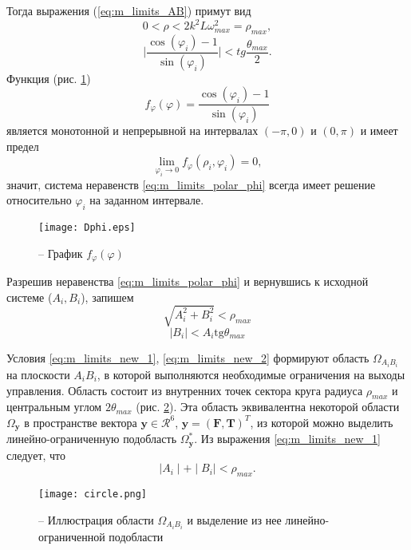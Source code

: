 Тогда выражения (\ref{eq:m_limits_AB}) примут вид
\begin{equation} \label{eq:m_limits_polar_rho}
0 < \rho < 
2 k^2 L\omega_{max}^2
= \rho_{max},
\end{equation}
\begin{equation} \label{eq:m_limits_polar_phi}
\Bigg| \frac{\cos(\varphi_i)-1}{\sin(\varphi_i)} \Bigg| < 
tg\frac{\theta_{max}}{2}.
\end{equation}
Функция (рис. \ref{fig:f_phi})
$$f_{\varphi}(\varphi) = \frac{\cos(\varphi_i)-1}{\sin(\varphi_i)}$$
является монотонной и непрерывной на интервалах 
$(-{\pi}, 0)$
и
$( 0, \pi)$
и имеет предел
$$\lim_{\varphi_i \to 0}
f_{\varphi}(\rho_i, \varphi_i) = 0,$$
значит, система неравенств
\eqref{eq:m_limits_polar_phi}
всегда имеет решение относительно $\varphi_i$ на заданном интервале.
\begin{figure}[h!]
	\centering
	\texttt{[image: Dphi.eps]}
	\caption{ -- График $f_{\varphi}(\varphi)$}
	\label{fig:f_phi}
\end{figure}
Разрешив неравенства \eqref{eq:m_limits_polar_phi} и вернувшись к исходной системе ($A_i, B_i$), запишем
\begin{equation} \label{eq:m_limits_new_1}
\sqrt{A^2_i +  B^2_i} <
\rho_{max}
\end{equation}
\begin{equation} \label{eq:m_limits_new_2}
|B_i| < A_i \text{tg} \theta_{max}
\end{equation}

Условия \eqref{eq:m_limits_new_1}, \eqref{eq:m_limits_new_2} формируют область $\Omega_{A_iB_i}$ на плоскости $A_iB_i$, в которой выполняются необходимые ограничения на выходы управления. Область состоит из внутренних точек сектора круга радиуса $\rho_{max}$ и центральным углом $2\theta_{max}$ (рис. \ref{fig:lim_circle}).
Эта область эквивалентна некоторой области $\Omega_{\bm{y}}$ в пространстве вектора  $\bm{y} \in \mathcal{R}^6$, $\bm{y} = (\bm{F}, \bm{T})^T$, из которой можно выделить линейно-ограниченную подобласть $\Omega^*_{\bm{y}}$.
Из выражения \eqref{eq:m_limits_new_1} следует, что
\begin{equation} \label{eq:rho_limits_lin}
\mid A_i \mid + \mid B_i \mid
< \rho_{max}.
\end{equation}

\begin{figure}[h!]
	\centering
	\texttt{[image: circle.png]}
	\caption{ -- Иллюстрация области $\Omega_{A_iB_i}$ и выделение из нее линейно-ограниченной подобласти}
	\label{fig:lim_circle}
\end{figure}

